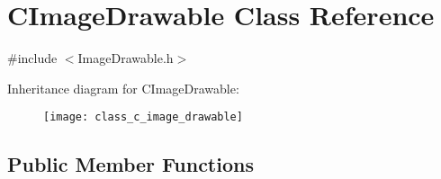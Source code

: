 \hypertarget{class_c_image_drawable}{\section{C\+Image\+Drawable Class Reference}
\label{class_c_image_drawable}
}


{\ttfamily \#include $<$Image\+Drawable.\+h$>$}

Inheritance diagram for C\+Image\+Drawable\+:\begin{figure}[H]
\begin{center}
\leavevmode
\texttt{[image: class\_c\_image\_drawable]}
\end{center}
\end{figure}
\subsection*{Public Member Functions}
